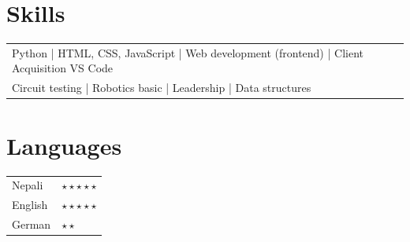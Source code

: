 \documentclass[a4paper,12pt]{article}
\begin{document}
\section{Skills}
\begin{tabularx}{\linewidth}{@{}l X@{}}	
Python | HTML, CSS, JavaScript | Web development (frontend) | Client Acquisition
VS Code \\  Circuit testing | Robotics basic | Leadership | Data structures 
\end{tabularx}{}


\section{Languages}
\begin{tabularx}{\linewidth}{@{}l X@{}}

Nepali & \normalsize{$\star\star\star\star\star$ } \\

English & \normalsize{$\star\star\star\star\star$ } \\

German & \normalsize{$\star \star$ }\\

\end{tabularx}
\end{document}

